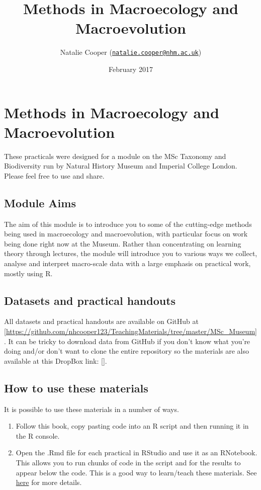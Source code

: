 \documentclass[]{book}
\title{Methods in Macroecology and Macroevolution}
\author{Natalie Cooper
(\href{mailto:natalie.cooper@nhm.ac.uk}{\nolinkurl{natalie.cooper@nhm.ac.uk}})}
\date{February 2017}
\providecommand{\tightlist}{%
  \setlength{\itemsep}{0pt}\setlength{\parskip}{0pt}}
\begin{document}
\maketitle

{
\setcounter{tocdepth}{1}
\tableofcontents
}
\chapter{Methods in Macroecology and
Macroevolution}\label{methods-in-macroecology-and-macroevolution}

These practicals were designed for a module on the MSc Taxonomy and
Biodiversity run by Natural History Museum and Imperial College London.
Please feel free to use and share.

\section{Module Aims}\label{module-aims}

The aim of this module is to introduce you to some of the cutting-edge
methods being used in macroecology and macroevolution, with particular
focus on work being done right now at the Museum. Rather than
concentrating on learning theory through lectures, the module will
introduce you to various ways we collect, analyse and interpret
macro-scale data with a large emphasis on practical work, mostly using
R.

\section{Datasets and practical
handouts}\label{datasets-and-practical-handouts}

All datasets and practical handouts are available on GitHub at
{[}\url{https://github.com/nhcooper123/TeachingMaterials/tree/master/MSc_Museum}{]}.
It can be tricky to download data from GitHub if you don't know what
you're doing and/or don't want to clone the entire repository so the
materials are also available at this DropBox link: {[}{]}.

\section{How to use these materials}\label{how-to-use-these-materials}

It is possible to use these materials in a number of ways.

\begin{enumerate}
\def\labelenumi{\arabic{enumi}.}
\tightlist
\item
  Follow this book, copy pasting code into an R script and then running
  it in the R console.
\item
  Open the .Rmd file for each practical in RStudio and use it as an
  RNotebook. This allows you to run chunks of code in the script and for
  the results to appear below the code. This is a good way to
  learn/teach these materials. See
  \href{http://rmarkdown.rstudio.com/r_notebooks.html}{here} for more
  details.
\end{enumerate}
\end{document}
